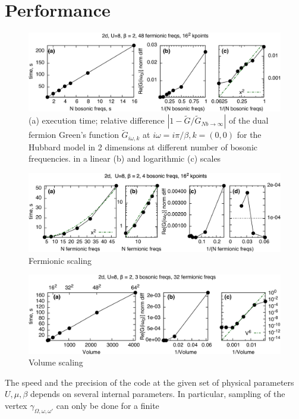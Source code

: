 \documentclass[3p,times,procedia]{elsarticle}
\begin{document}
\section{Performance}

\begin{figure}[ht]
\includegraphics[width=1.0\columnwidth]{time_bfreqs.pdf}
\caption{(a) execution time; relative difference $|1 - \tilde G/\tilde G_{Nb\to \infty}|$ of the dual fermion Green's function $\tilde G_{i\omega, k}$ at $i\omega = i\pi / \beta, k = (0,0)$ for the Hubbard model in 2 dimensions at different number of bosonic frequencies. in a linear (b) and logarithmic (c) scales }
\end{figure}

\begin{figure}[ht]
\includegraphics[width=1.0\columnwidth]{time_ffreqs.pdf}
\caption{Fermionic scaling}
\end{figure}

\begin{figure}[ht]
\includegraphics[width=1.0\columnwidth]{time_kpts.pdf}
\caption{Volume scaling}
\end{figure}

The speed and the precision of the code at the given set of physical parameters $U, \mu, \beta$ depends on several internal parameters. In particular, sampling of the vertex $\gamma_{\Omega,\omega,\omega'}$ can only be done for a finite 
\end{document}
